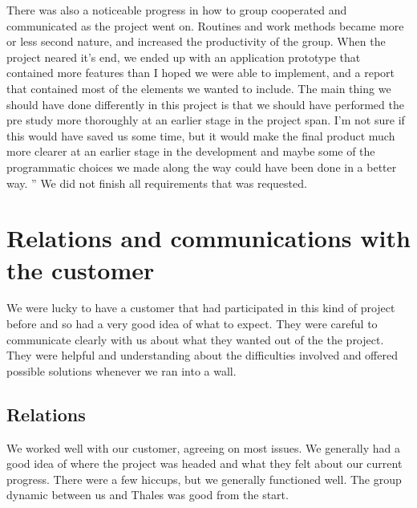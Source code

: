 There was also a noticeable progress in how to group cooperated and communicated as the project went on. Routines and work methods became more or less second nature, and increased the productivity of the group. When the project neared it’s end, we ended up with an application prototype that contained more features than I hoped we were able to implement, and a report that contained most of the elements we wanted to include.
\newline
\newline
The main thing we should have done differently in this project is that we should have performed the pre study more thoroughly at an earlier stage in the project span. I’m not sure if this would have saved us some time, but it would make the final product much more clearer at an earlier stage in the development and maybe some of the programmatic choices we made along the way could have been done in a better way.
''
\newline
\newline
We did not finish all requirements that was requested.  

\section{Relations and communications with the customer}
We were lucky to have a customer that had participated in this kind of project before and so had a very good idea of what to expect. They were careful to communicate clearly with us about what they wanted out of the the project. They were helpful and understanding about the difficulties involved and offered possible solutions whenever we ran into a wall.
\subsection{Relations}
We worked well with our customer, agreeing on most issues. We generally had a good idea of where the project was headed and what they felt about our current progress. There were a few hiccups, but we generally functioned well. The group dynamic between us and Thales was good from the start.

